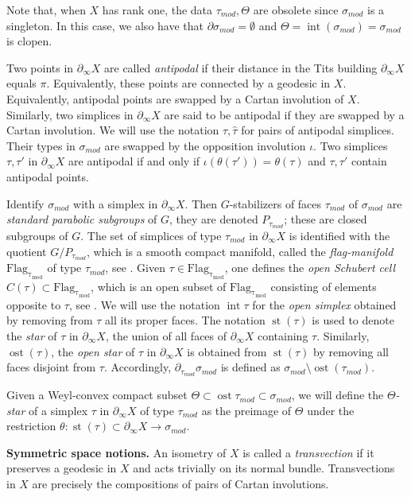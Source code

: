\documentclass[12pt]{article}
\theoremstyle{boldplain}
\theoremstyle{bolddefinition}
\numberwithin{equation}{section}
\def\si{\sigma}
\def\D{\partial}
\def\Dt{\partial_{\tau_{mod}}}
\def\Flagt{\operatorname{Flag_{\tau_{mod}}}}
\def\geo{\partial_{\infty}}
\def\inte{\operatorname{int}}
\def\simod{\si_{mod}}
\def\st{\operatorname{st}}
\def\ost{\operatorname{ost}}
\def\taumod{\tau_{mod}}
\begin{document}
 
 Note that, when $X$ has rank one, the data $\taumod, \Theta$ are obsolete since $\simod$ is a singleton. In this case, we also have that $\D\simod=\emptyset$ and $\Theta=\inte(\simod)=\simod$ is clopen. 
 
Two points in $\geo X$ are called {\em antipodal} if their distance in the Tits building $\geo X$ equals $\pi$. Equivalently, these points are connected by a geodesic in $X$. Equivalently, antipodal points are swapped by a Cartan involution of $X$. Similarly, two simplices in $\geo X$ are said to be antipodal if they are swapped by a Cartan involution. We will use the notation $\tau, \hat\tau$ for pairs of antipodal simplices. Their types in $\simod$ are swapped by the opposition involution $\iota$. Two simplices $\tau, \tau'$ in $\geo X$ are antipodal if and only if $\iota(\theta(\tau'))=\theta(\tau)$ and $\tau, \tau'$ contain antipodal points. 
 
Identify $\simod$ with a simplex in $\geo X$. Then $G$-stabilizers of faces $\taumod$ of $\simod$  
 are {\em standard parabolic subgroups} of $G$, they are denoted $P_{\taumod}$; these are closed subgroups of $G$. The set of simplices of type $\taumod$ in $\geo X$ is identified with the quotient 
 $G/P_{\taumod}$, which is a smooth compact manifold, called the {\em flag-manifold} $\Flagt$ of type $\taumod$, see \cite[\S 2.2.2, 2.2.3]{anolec}.  Given $\tau\in \Flagt$, one defines 
 the {\em open Schubert cell} $C(\tau)\subset \Flagt$, which is an open subset of  $\Flagt$ 
 consisting of elements opposite to $\tau$,  see \cite[\S 2.4]{anolec}. We will use the notation $\inte\tau$ for the {\em open simplex} obtained by removing from $\tau$ all its proper faces. The notation $\st(\tau)$ is used to denote the {\em star} of $\tau$ in $\geo X$, the union of all faces of 
 $\geo X$ containing $\tau$. Similarly, $\ost(\tau)$, the {\em open star} of $\tau$ in $\geo X$ is obtained from $\st(\tau)$ by removing all faces disjoint from $\tau$. Accordingly,
 $\Dt \simod$ is defined as $\simod \setminus \ost(\taumod)$. 
 
 Given a Weyl-convex compact subset $\Theta\subset \ost\taumod\subset \simod$, we will define the 
 {\em $\Theta$-star} of a simplex $\tau$ in $\geo X$ of type $\taumod$ as the preimage of 
 $\Theta$ under the restriction $\theta: \st(\tau)\subset \geo X\to \simod$. 
 
 
 
 
\medskip
 {\bf Symmetric space notions.} An isometry of $X$ is called a {\em transvection} if it preserves a geodesic in $X$ and acts trivially on its normal bundle. Transvections in $X$ are precisely the compositions of pairs of Cartan involutions. 
 
\end{document}
